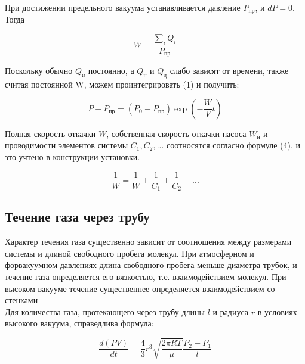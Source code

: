 \documentclass[a4paper, 12pt]{article}
\begin{document}
При достижении предельного вакуума устанавливается давление $P_{\text{пр}}$, и $dP = 0$. Тогда

\bigskip

\begin{equation}
 	W = \frac{ \sum_i Q_i }{P_{\text{пр}}}
\end{equation}

\bigskip

Поскольку обычно $Q_\text{и}$ постоянно, а $Q_\text{н}$ и $Q_\text{д}$ слабо зависят от времени, также считая постоянной W, можем проинтегрировать (1) и получить:

\bigskip

\begin{equation}
 	P - P_{\text{пр}} = (P_0 - P_{\text{пр}})\exp(-\frac{W}{V}t)
\end{equation}

\bigskip

Полная скорость откачки $W$, собственная скорость откачки насоса $W_{\text{н}}$ и проводимости элементов системы $C_1, C_2,...$ соотносятся согласно формуле (4), и это учтено в конструкции установки.

\bigskip

\begin{equation}
    \frac{1}{W} = \frac{1}{W} + \frac{1}{C_1} + \frac{1}{C_2} + ...
\end{equation}

\subsection*{Течение газа через трубу}

Характер течения газа существенно зависит от соотношения между размерами системы и длиной свободного пробега молекул. При атмосферном и форвакуумном давлениях  длина свободного пробега меньше диаметра трубок, и течение газа определяется его вязкостью, т.е. взаимодействием молекул. При высоком вакууме течение существеннее определяется взаимодействием со стенками \\
Для количества газа, протекающего через трубу длины $l$ и радиуса $r$ в условиях высокого вакуума, справедлива формула:

\bigskip

\begin{equation}
	\frac{d(PV)}{dt} = \frac{4}{3}r^3\sqrt{\frac{2\pi RT}{\mu}}\frac{P_2 - P_1}{l}
\end{equation}

\bigskip
\end{document}
